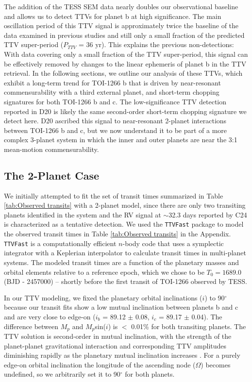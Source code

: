 \documentclass[twocolumn]{aastex631}
\begin{document}
The addition of the TESS SEM data nearly doubles our observational baseline and allows us to detect TTVs for planet b at high significance. The main oscillation period of this TTV signal is approximately twice the baseline of the data examined in previous studies and still only a small fraction of the predicted TTV super-period ($P_{TTV}$ = 36 yr). This explains the previous non-detections: With data covering only a small fraction of the TTV super-period, this signal can be effectively removed by changes to the linear ephemeris of planet b in the TTV retrieval. In the following sections, we outline our analysis of these TTVs, which exhibit a long-term trend for TOI-1266 b that is driven by near-resonant commensurability with a third external planet, and short-term chopping signatures for both TOI-1266 b and c. The low-significance TTV detection reported in D20 is likely the same second-order short-term chopping signature we detect here. D20 ascribed this signal to near-resonant 2-planet interactions between TOI-1266 b and c, but we now understand it to be part of a more complex 3-planet system in which the inner and outer planets are near the 3:1 mean-motion commensurability.

\subsection{The 2-Planet Case} \label{sec:2-planet TTVs}

We initially attempted to fit the set of transit times summarized in Table \ref{tab:Observed transits} with a 2-planet model, since there are only two transiting planets identified in the system and the RV signal at $\sim$32.3 days reported by C24 is characterized as a tentative detection. We used the \texttt{TTVFast} package to model the observed transit times in Table \ref{tab:Observed transits} in the Appendix. \texttt{TTVFast} \citep{TTVFast} is a computationally efficient $n$-body code that uses a symplectic integrator with a Keplerian interpolator to calculate transit times in multi-planet systems. The modeled transit times are a function of the planetary masses and orbital elements relative to a reference epoch, which we chose to be $T_0 = 1689.0$ (BJD - 2457000) -- shortly before the first transit of TOI-1266 observed by TESS. 

In our TTV modeling, we fixed the planetary orbital inclinations ($i$) to 90$^{\circ}$ 
because our transit fits show a low mutual inclination between planets b and c and are very close to edge-on ($i_b$ = 89.12 $\pm$ 0.08, $i_c$ = 89.17 $\pm$ 0.04). The difference between $M_{p}$ and $M_{p}$sin($i$) is $<$ 0.01\% for both transiting planets. The TTV solution is second-order in mutual inclination, with the strength of the planet-planet gravitational interaction and corresponding TTV amplitudes diminishing rapidly as the planetary mutual inclination increases \citep{nesvorny_2014, hadden_lithwick_2016}. For a purely edge-on orbital inclination the longitude of the ascending node ($\Omega$) becomes undefined, so we arbitrarily set it to 90$^{\circ}$ for both planets. 
\end{document}
